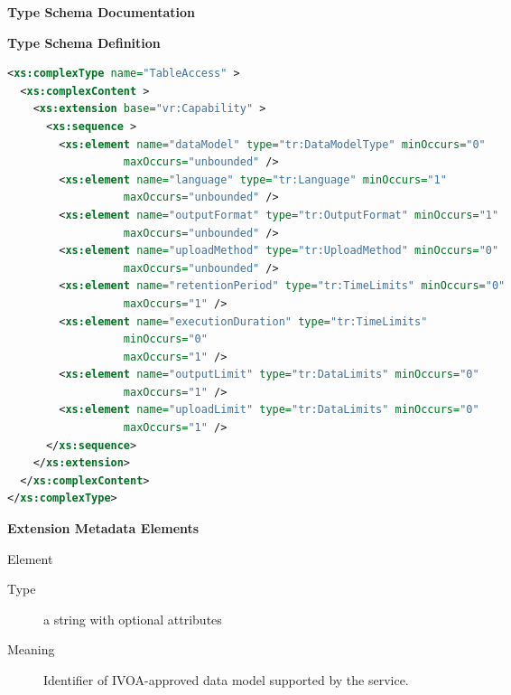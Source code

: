 \documentclass{ivoa}
\begin{document}
\begin{generated}
\begingroup
      	\renewcommand*\descriptionlabel[1]{%
      	\hbox to 5.5em{\emph{#1}\hfil}}\vspace{2ex}\noindent\textbf{ Type Schema Documentation}



\vspace{1ex}\noindent\textbf{ Type Schema Definition}

\begin{lstlisting}[language=XML,basicstyle=\footnotesize]
<xs:complexType name="TableAccess" >
  <xs:complexContent >
    <xs:extension base="vr:Capability" >
      <xs:sequence >
        <xs:element name="dataModel" type="tr:DataModelType" minOccurs="0"
                  maxOccurs="unbounded" />
        <xs:element name="language" type="tr:Language" minOccurs="1"
                  maxOccurs="unbounded" />
        <xs:element name="outputFormat" type="tr:OutputFormat" minOccurs="1"
                  maxOccurs="unbounded" />
        <xs:element name="uploadMethod" type="tr:UploadMethod" minOccurs="0"
                  maxOccurs="unbounded" />
        <xs:element name="retentionPeriod" type="tr:TimeLimits" minOccurs="0"
                  maxOccurs="1" />
        <xs:element name="executionDuration" type="tr:TimeLimits"
                  minOccurs="0"
                  maxOccurs="1" />
        <xs:element name="outputLimit" type="tr:DataLimits" minOccurs="0"
                  maxOccurs="1" />
        <xs:element name="uploadLimit" type="tr:DataLimits" minOccurs="0"
                  maxOccurs="1" />
      </xs:sequence>
    </xs:extension>
  </xs:complexContent>
</xs:complexType>
\end{lstlisting}

\vspace{0.5ex}\noindent\textbf{ Extension Metadata Elements}

\begingroup\small\begin{bigdescription}\item[Element \xmlel{dataModel}]
\begin{description}
\item[Type] a string with optional attributes
\item[Meaning] 
              Identifier of IVOA-approved data model supported by the 
              service.
              

\end{description}
\end{bigdescription}
\end{generated}
\end{document}
